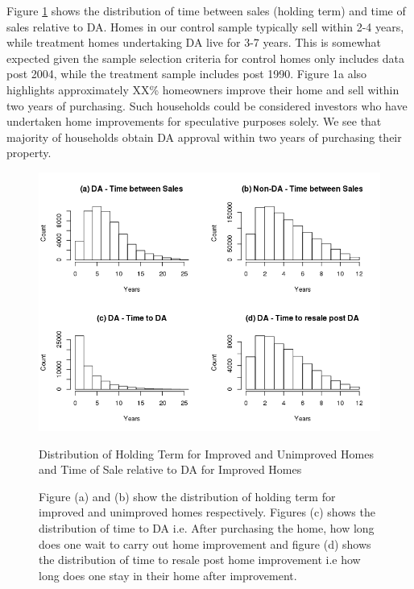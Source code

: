 \documentclass[AEJ,reqno, draftmode]{AEA} %
\begin{document}
  

Figure \ref{fig:Rplot_month_bet_sale_notional} shows the distribution of time between sales (holding term) and time of sales relative to DA. Homes in our control sample typically sell within 2-4 years, while treatment homes undertaking DA live for 3-7 years. This is somewhat expected given the sample selection criteria for control homes only includes data post 2004, while the treatment sample includes post 1990. Figure 1a also highlights approximately XX\% homeowners improve their home and sell within two years of purchasing. Such households could be considered investors who have undertaken home improvements for speculative purposes solely. We see that majority of households obtain DA approval within two years of purchasing their property. 



\captionsetup[figure]{font=large,skip=0pt}

\begin{figure}[!htb]
    \centering
     \includegraphics[width=\columnwidth]{Figures/Time_bet_sale_notional2004_after_ACT_NT_Rplot.png} \par
 \caption{Distribution of Holding Term for Improved and Unimproved Homes and Time of Sale relative to DA for Improved Homes}
 \label{fig:Rplot_month_bet_sale_notional}
 \caption*{\small Figure (a) and (b) show the distribution of holding term for improved and unimproved homes respectively. Figures (c) shows the distribution of time to DA i.e. After purchasing the home, how long does one wait to carry out home improvement and figure (d) shows the distribution of time to resale post home improvement i.e how long does one stay in their home after improvement.}
  \vspace*{-\baselineskip}
 \end{figure}
\end{document}
